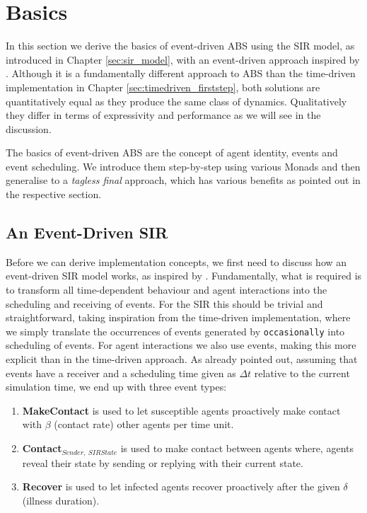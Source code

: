 \section{Basics}
\label{sec:eventdriven_basics}
In this section we derive the basics of event-driven ABS using the SIR model, as introduced in Chapter \ref{sec:sir_model}, with an event-driven approach inspired by \cite{macal_agent-based_2010}. Although it is a fundamentally different approach to ABS than the time-driven implementation in Chapter \ref{sec:timedriven_firststep}, both solutions are quantitatively equal as they produce the same class of dynamics. Qualitatively they differ in terms of expressivity and performance as we will see in the discussion.

The basics of event-driven ABS are the concept of agent identity, events and event scheduling. We introduce them step-by-step using various Monads and then generalise to a \textit{tagless final} approach, which has various benefits as pointed out in the respective section. 

\subsection{An Event-Driven SIR}
Before we can derive implementation concepts, we first need to discuss how an event-driven SIR model works, as inspired by \cite{macal_agent-based_2010}. Fundamentally, what is required is to transform all time-dependent behaviour and agent interactions into the scheduling and receiving of events. For the SIR this should be trivial and straightforward, taking inspiration from the time-driven implementation, where we simply translate the occurrences of events generated by \texttt{occasionally} into scheduling of events. For agent interactions we also use events, making this more explicit than in the time-driven approach. As already pointed out, assuming that events have a receiver and a scheduling time given as $\Delta t$ relative to the current simulation time, we end up with three event types:

\begin{enumerate}
	\item \textbf{MakeContact} is used to let susceptible agents proactively make contact with $\beta$ (contact rate) other agents per time unit.
	\item \textbf{Contact$_{Sender, \ SIRState}$} is used to make contact between agents where, agents reveal their state by sending or replying with their current state.
	\item \textbf{Recover} is used to let infected agents recover proactively after the given $\delta$ (illness duration). 
\end{enumerate}

